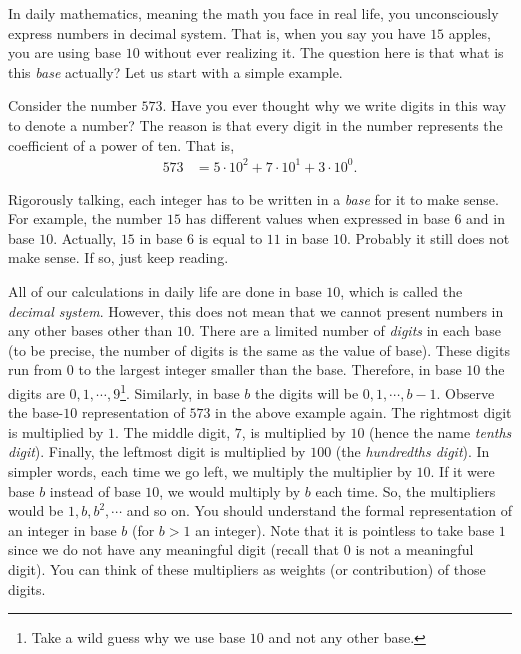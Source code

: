 \documentclass{subfile}
\begin{document}
	In daily mathematics, meaning the math you face in real life, you unconsciously express numbers in decimal system. That is, when you say you have $15$ apples, you are using base $10$ without ever realizing it. The question here is that what is this \textit{base} actually? Let us start with a simple example.
		\begin{example}
			Consider the number $573$. Have you ever thought why we write digits in this way to denote a number? The reason is that every digit in the number represents the coefficient of a power of ten. That is,
			\begin{align*}
				573
					& = 5 \cdot 10^2 + 7 \cdot 10^1 + 3 \cdot 10^0.
			\end{align*}
		\end{example}
	Rigorously talking, each integer has to be written in a \textit{base} for it to make sense. For example, the number $15$ has different values when expressed in base $6$ and in base $10$. Actually, $15$ in base $6$ is equal to $11$ in base $10$. Probably it still does not make sense. If so, just keep reading.

	All of our calculations in daily life are done in base $10$, which is called the \textit{decimal system}. However, this does not mean that we cannot present numbers in any other bases other than $10$. There are a limited number of \textit{digits} in each base (to be precise, the number of digits is the same as the value of base). These digits run from $0$ to the largest integer smaller than the base. Therefore, in base $10$ the digits are $0,1,\cdots,9$\footnote{Take a wild guess why we use base $10$ and not any other base.}. Similarly, in base $b$ the digits will be $0,1,\cdots,b-1$. Observe the base-$10$ representation of $573$ in the above example again. The rightmost digit is multiplied by $1$. The middle digit, $7$, is multiplied by $10$ (hence the name \textit{tenths digit}). Finally, the leftmost digit is multiplied by $100$ (the \textit{hundredths digit}). In simpler words, each time we go left, we multiply the multiplier by $10$. If it were base $b$ instead of base $10$, we would multiply by $b$ each time. So, the multipliers would be $1,b,b^2,\cdots$ and so on. You should understand the formal representation of an integer in base $b$ (for $b>1$ an integer). Note that it is pointless to take base $1$ since we do not have any meaningful digit (recall that $0$ is not a meaningful digit). You can think of these multipliers as weights (or contribution) of those digits.
\end{document}
